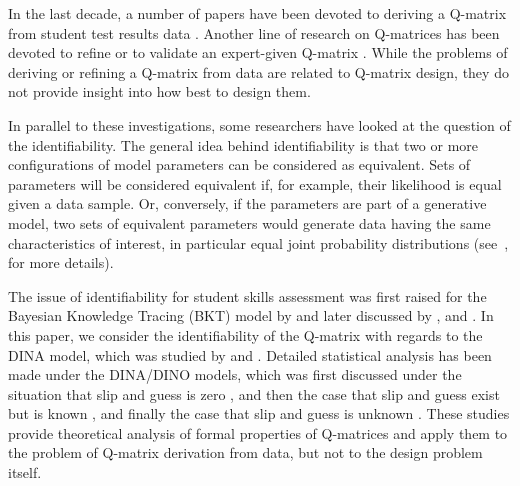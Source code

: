 \documentclass{edm_template}
\begin{document}
In the last decade, a number of papers have been devoted to deriving a Q-matrix from student test results data \cite{barnes2010novel, liu2012data, desmarais2015combining, xu2016boosted}.  Another line of research on Q-matrices has been devoted to refine or to validate an expert-given Q-matrix \cite{de2015general, chiu2013statistical, desmarais2013matrix}.  While the problems of deriving or refining a Q-matrix from data are related to Q-matrix design, they do not provide insight into how best to design them.

In parallel to these investigations, some researchers have looked at the question of the identifiability.  The general idea behind identifiability is that two or more configurations of model parameters can be considered as equivalent.  Sets of parameters will be considered equivalent if, for example, their likelihood is equal given a data sample.  Or, conversely, if the parameters are part of a generative model, two sets of equivalent parameters would generate data having the same characteristics of interest, in particular equal joint probability distributions (see~, for more details).

The issue of identifiability for student skills assessment was first raised for the Bayesian Knowledge Tracing (BKT) model by  and later discussed by , and .  In this paper, we consider the identifiability of the Q-matrix with regards to the DINA model, which was studied by  and .  Detailed statistical analysis has been made under the DINA/DINO models, which was first discussed under the situation that slip and guess is zero \cite{chiu2009cluster}, and then the case that slip and guess exist but is known \cite{liu2013theory}, and finally the case that slip and guess is unknown \cite{chen2015statistical}.  These studies provide theoretical analysis of formal properties of Q-matrices and apply them to the problem of Q-matrix derivation from data, but not to the design problem itself.

\end{document}
